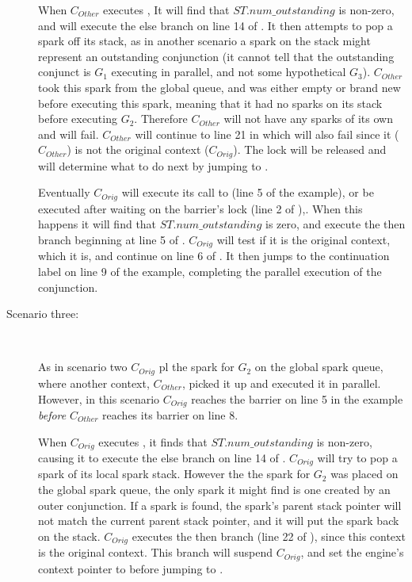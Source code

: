 \begin{description}
    When $C_{Other}$ executes \joinandcontinue,
    It will find that $ST.num\_outstanding$ is non-zero,
    and will execute the else branch on line 14 of \joinandcontinue.
    It then attempts to pop a spark off its stack,
    as in another scenario a spark on the stack might represent an
    outstanding conjunction
    (it cannot tell that the outstanding conjunct is $G_1$ executing in
    parallel, and not some hypothetical $G_3$).
    $C_{Other}$ took this spark from the global queue,
    and was either empty or brand new before executing this spark,
    meaning that it had no sparks on its stack before executing $G_2$.
    Therefore $C_{Other}$ will not have any sparks of its own and
     will fail.
    $C_{Other}$ will continue to line 21 in \joinandcontinue
    which will also fail since it ($C_{Other}$)
    is not the original context ($C_{Orig}$).
    The lock will be released and \joinandcontinue will determine what to do
    next by jumping to \getglobalwork.

    Eventually $C_{Orig}$ will execute its call to \joinandcontinue
    (line 5 of the example),
    or be executed after waiting on the barrier's lock (line 2 of
    \joinandcontinue),.
    When this happens it will find that $ST.num\_outstanding$ is zero,
    and execute the then branch beginning at line 5 of \joinandcontinue.
    $C_{Orig}$ will test if it is the original context, 
    which it is,
    and continue on line 6 of \joinandcontinue.
    It then jumps to the continuation label on line 9 of the example,
    completing the parallel execution of the conjunction.

    \item[Scenario three:]~

    As in scenario two $C_{Orig}$ pl the spark for $G_2$ on the global spark
    queue,
    where another context, $C_{Other}$, picked it up and executed it
    in parallel.
    However,
    in this scenario
    $C_{Orig}$ reaches the barrier on line 5 in the example \emph{before}
    $C_{Other}$ reaches its barrier on line 8.

    When $C_{Orig}$ executes \joinandcontinue,
    it finds that $ST.num\_outstanding$ is non-zero,
    causing it to execute the else branch on line 14 of \joinandcontinue.
    $C_{Orig}$ will try to pop a spark of its local spark stack.
    However the the spark for $G_2$ was placed on the global
    spark queue,
    the only spark it might find is one created by an outer conjunction.
    If a spark is found, the spark's parent stack pointer will not match the
    current parent stack pointer,
    and it will put the spark back on the stack.
    $C_{Orig}$ executes the then branch (line 22 of \joinandcontinue), since this
    context is the original context.
    This branch will suspend $C_{Orig}$,
    and set the engine's context pointer to \NULL
    before jumping to \getglobalwork.


\end{description}
